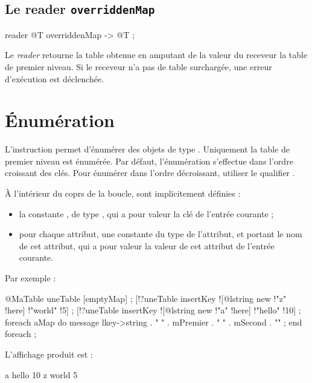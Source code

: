 \subsection{Le reader \texttt{overriddenMap}}

\begin{galgascode}
reader @T overriddenMap -> @T ;
\end{galgascode}


Le \emph{reader}  retourne la table obtenue en amputant de la valeur du receveur la table de premier niveau. Si le receveur n'a pas de table surchargée, une erreur d'exécution est déclenchée.





\section{Énumération}

L'instruction  permet d'énumérer des objets de type . Uniquement la table de premier niveau est énumérée. Par défaut, l'énumération s'effectue dans l'ordre croissant des clés. Pour énumérer dans l'ordre décroissant, utiliser le qualifier \galgas{>}.

À l'intérieur du coprs de la boucle, sont implicitement définies :
\begin{itemize}
  \item la constante , de type , qui a pour valeur la clé de l'entrée courante ;
  \item pour chaque attribut, une constante du type de l'attribut, et portant le nom de cet attribut, qui a pour valeur la valeur de cet attribut de l'entrée courante.
\end{itemize}

Par exemple :
\begin{galgascode}
@MaTable uneTable [emptyMap] ;
[!?uneTable insertKey ![@lstring new !"z" !here] !"world" !5] ;
[!?uneTable insertKey ![@lstring new !"a" !here] !"hello" !10] ;
foreach aMap do
  message lkey->string . " " . mPremier . " " . mSecond . "\n" ;
end foreach ;
\end{galgascode}

L'affichage produit est :

\begin{galgascode}
a hello 10
z world 5
\end{galgascode}


